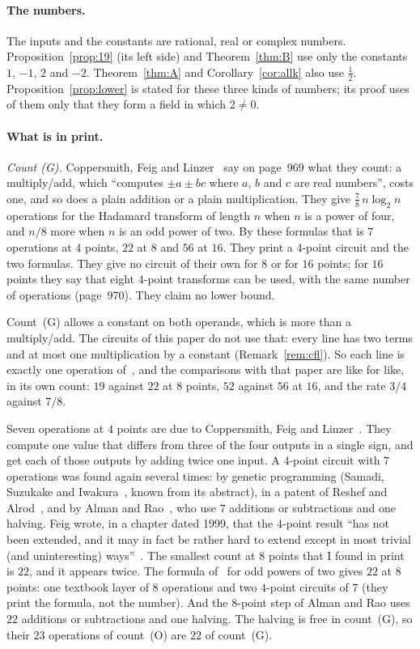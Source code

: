 \documentclass[10pt]{article}
\theoremstyle{remark}
\newcommand{\cntG}{\textup{(G)}}
\newcommand{\cntO}{\textup{(O)}}
\renewcommand{\lg}{\log_2}
\begin{document}
\paragraph{The numbers.}
The inputs and the constants are rational, real or complex numbers. Proposition~\ref{prop:19} (its left
side) and Theorem~\ref{thm:B} use only the constants $1$, $-1$, $2$ and $-2$. Theorem~\ref{thm:A} and
Corollary~\ref{cor:allk} also use $\tfrac12$. Proposition~\ref{prop:lower} is stated for these three kinds of
numbers; its proof uses of them only that they form a field in which $2\ne0$.

\paragraph{What is in print.}
\emph{Count \cntG.} Coppersmith, Feig and Linzer~\cite{CFL} say on page~969 what they count: a multiply/add,
which ``computes $\pm a\pm bc$ where $a$, $b$ and $c$ are real numbers'', costs one, and so does a plain
addition or a plain multiplication. They give $\tfrac78\,n\lg n$ operations for the Hadamard transform of
length $n$ when $n$ is a power of four, and $n/8$ more when $n$ is an odd power of two. By these formulas
that is $7$ operations at $4$ points, $22$ at $8$ and $56$ at $16$. They print a $4$-point circuit and the
two formulas. They give no circuit of their own for $8$ or for $16$ points; for $16$ points they say that
eight $4$-point transforms can be used, with the same number of operations (page~970). They claim no lower
bound.

Count~\cntG{} allows a constant on both operands, which is more than a multiply/add. The circuits of this
paper do not use that: every line has two terms and at most one multiplication by a constant
(Remark~\ref{rem:cfl}). So each line is exactly one operation of~\cite{CFL}, and the comparisons with that
paper are like for like, in its own count: $19$ against $22$ at $8$ points, $52$ against $56$ at $16$, and
the rate $3/4$ against $7/8$.

Seven operations at $4$ points are due to Coppersmith, Feig and Linzer~\cite[page~969]{CFL}. They compute one
value that differs from three of the four outputs in a single sign, and get each of those outputs by adding
twice one input. A $4$-point circuit with $7$ operations was found again several times: by genetic
programming (Samadi, Suzukake and Iwakura~\cite{Samadi}, known from its abstract), in a patent of Reshef
and Alrod~\cite{Patent}, and by Alman and Rao~\cite{AR}, who use $7$ additions or subtractions and one
halving. Feig wrote, in a chapter dated 1999, that the $4$-point result ``has not been extended, and it may in fact be rather
hard to extend except in most trivial (and uninteresting) ways''~\cite{Feig}. The smallest count at $8$ points
that I found in print is $22$, and it appears twice. The formula of~\cite{CFL} for odd powers of two gives
$22$ at $8$ points: one textbook layer of $8$ operations and two $4$-point circuits of $7$ (they print the
formula, not the number). And the $8$-point step of Alman and Rao uses $22$ additions or subtractions and
one halving. The halving is free in count~\cntG, so their $23$ operations of count~\cntO{} are $22$ of count~\cntG.
\end{document}
